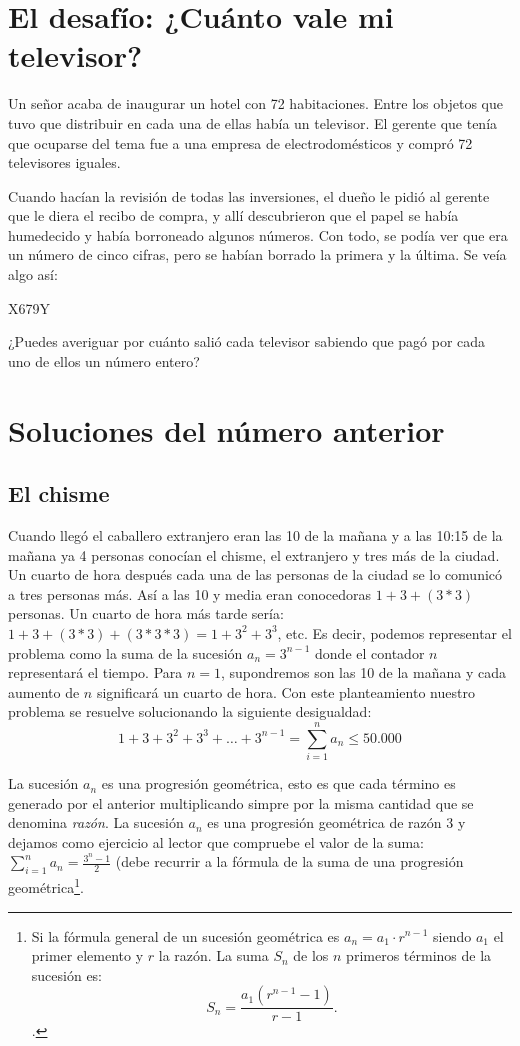 \begin{multicols}{2}
\section*{El desafío: ¿Cuánto vale mi televisor?}
Un señor acaba de inaugurar un hotel con 72 habitaciones.
Entre los objetos que tuvo que distribuir en cada una de ellas
había un televisor. El gerente que tenía que ocuparse del tema
fue a una empresa de electrodomésticos y compró 72 televisores
iguales.

Cuando hacían la revisión de todas las inversiones, el dueño
le pidió al gerente que le diera el recibo de compra, y allí descubrieron que el papel se había humedecido y había borroneado
algunos números. Con todo, se podía ver que era un número de
cinco cifras, pero se habían borrado la primera y la última. Se
veía algo así:
\begin{center}\huge{X679Y}\end{center}
¿Puedes averiguar por cuánto salió cada televisor sabiendo que pagó por cada uno de ellos un número entero?

\section*{\textcolor{redsol}{Soluciones del número anterior}}
\subsection*{El chisme}
Cuando llegó el caballero extranjero eran las 10 de la mañana y a las 10:15 de la mañana ya 4 personas conocían el chisme, el extranjero y tres más de la ciudad. Un cuarto de hora después cada una de las personas de la ciudad se lo comunicó a tres personas más. Así a las 10 y media eran conocedoras $1+3+(3*3)$ personas. Un cuarto de hora más tarde sería: $1+3+(3*3)+(3*3*3)=1+3^2+3^3$, etc. Es decir, podemos representar el problema como la suma de la sucesión $a_n=3^{n-1}$ donde el contador $n$ representará el tiempo. Para $n=1$, supondremos son las 10 de la mañana y cada aumento de $n$ significará un cuarto de hora. Con este planteamiento nuestro problema se resuelve solucionando la siguiente desigualdad:
\begin{equation}
1+3+3^2+3^3+\dots+3^{n-1}=\sum_{i=1}^n a_n \leq 50.000
\end{equation}

La sucesión $a_n$ es una progresión geométrica, esto es que cada término es generado por el anterior multiplicando simpre por la misma cantidad que se denomina \emph{razón}. La sucesión $a_n$ es una progresión geométrica de razón 3 y dejamos como ejercicio al lector que compruebe el valor de la suma:$\sum_{i=1}^n a_n=\frac{3^{n}-1}{2}$ (debe recurrir a la fórmula de la suma de una progresión geométrica\footnote{Si la fórmula general de un sucesión geométrica es $a_n=a_1 \cdot r^{n-1}$ siendo $a_1$ el primer elemento y $r$ la razón. La suma $S_n$ de los $n$ primeros términos de la sucesión es:
$$
S_n=\frac{a_1 (r^{n-1}-1)}{r-1}.
$$. 
}.


\end{multicols}
